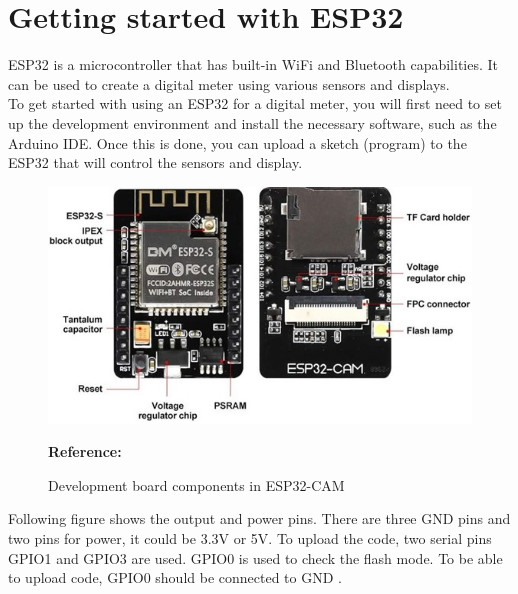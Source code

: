 

\chapter{Getting started with ESP32}

	ESP32 is a microcontroller that has built-in WiFi and Bluetooth capabilities. It can be used to create a digital meter using various sensors and displays.\\
	
	To get started with using an ESP32 for a digital meter, you will first need to set up the development environment and install the necessary software, such as the Arduino IDE. Once this is done, you can upload a sketch (program) to the ESP32 that will control the sensors and display.\\
	
\begin{figure}  [H]
	\begin{center}
		\includegraphics[width=12cm]{Chapters/ESP32components}
		\caption{Development board components in ESP32-CAM} 
		\label{fig:Components in ESP32 Cam}
		\footnotesize \textbf{Reference:} \autocite{Lab:2021}
	\end{center}
\end{figure}

Following figure shows the output and power pins. There are three GND pins and two pins for power, it could be 3.3V or 5V. To upload the code, two serial pins GPIO1 and GPIO3 are used. GPIO0 is used to check the flash mode. To be able to upload code, GPIO0 should be connected to GND \autocite{randomnerdtutorials}.

